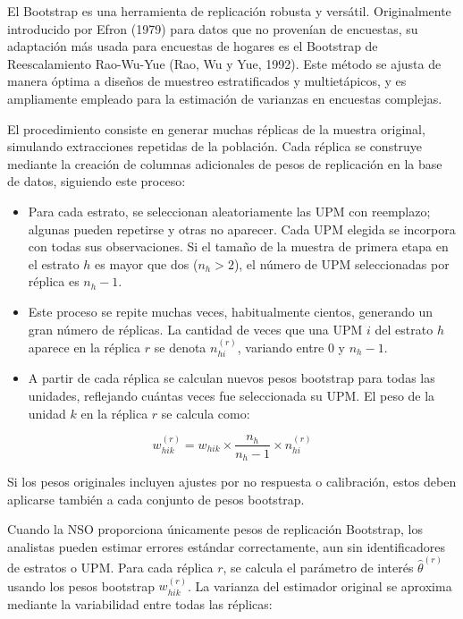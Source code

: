 \documentclass[
  12pt,
]{book}
\providecommand{\tightlist}{%
  \setlength{\itemsep}{0pt}\setlength{\parskip}{0pt}}
\begin{document}
El Bootstrap es una herramienta de replicación robusta y versátil. Originalmente introducido por Efron (1979) para datos que no provenían de encuestas, su adaptación más usada para encuestas de hogares es el Bootstrap de Reescalamiento Rao-Wu-Yue (Rao, Wu y Yue, 1992). Este método se ajusta de manera óptima a diseños de muestreo estratificados y multietápicos, y es ampliamente empleado para la estimación de varianzas en encuestas complejas.

El procedimiento consiste en generar muchas réplicas de la muestra original, simulando extracciones repetidas de la población. Cada réplica se construye mediante la creación de columnas adicionales de pesos de replicación en la base de datos, siguiendo este proceso:

\begin{itemize}
\tightlist
\item
  Para cada estrato, se seleccionan aleatoriamente las UPM con reemplazo; algunas pueden repetirse y otras no aparecer. Cada UPM elegida se incorpora con todas sus observaciones. Si el tamaño de la muestra de primera etapa en el estrato \(h\) es mayor que dos (\(n_h > 2\)), el número de UPM seleccionadas por réplica es \(n_h - 1\).
\item
  Este proceso se repite muchas veces, habitualmente cientos, generando un gran número de réplicas. La cantidad de veces que una UPM \(i\) del estrato \(h\) aparece en la réplica \(r\) se denota \(n_{hi}^{(r)}\), variando entre 0 y \(n_h - 1\).
\item
  A partir de cada réplica se calculan nuevos pesos bootstrap para todas las unidades, reflejando cuántas veces fue seleccionada su UPM. El peso de la unidad \(k\) en la réplica \(r\) se calcula como:
\end{itemize}

\[
w_{hik}^{(r)} = w_{hik} \times \frac{n_h}{n_h - 1} \times n_{hi}^{(r)}
\]

Si los pesos originales incluyen ajustes por no respuesta o calibración, estos deben aplicarse también a cada conjunto de pesos bootstrap.

Cuando la NSO proporciona únicamente pesos de replicación Bootstrap, los analistas pueden estimar errores estándar correctamente, aun sin identificadores de estratos o UPM. Para cada réplica \(r\), se calcula el parámetro de interés \(\hat{\theta}^{(r)}\) usando los pesos bootstrap \(w_{hik}^{(r)}\). La varianza del estimador original se aproxima mediante la variabilidad entre todas las réplicas:
\end{document}
